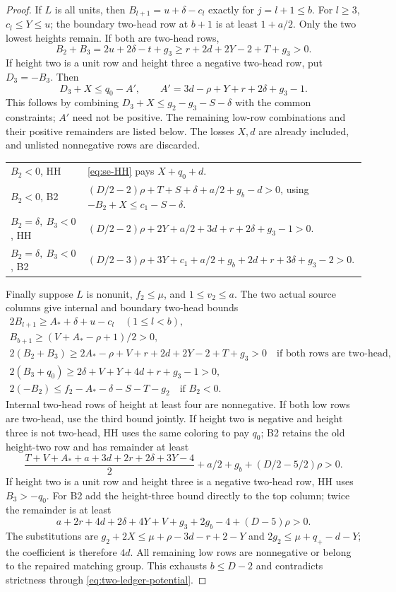 \documentclass[11pt,a4paper]{article}
\theoremstyle{definition}
\begin{document}
\begin{proof}
If $L$ is all units, then $B_{l+1}=u+\delta-c_l$ exactly for $j=l+1\le b$. For $l\ge3$, $c_l\le Y\le u$; the boundary two-head row at $b+1$ is at least $1+a/2$. Only the two lowest heights remain. If both are two-head rows,
\[
B_2+B_3=2u+2\delta-t+g_3
\ge r+2d+2Y-2+T+g_3>0.
\]
If height two is a unit row and height three a negative two-head row, put $D_3=-B_3$. Then
\[
D_3+X\le q_0-A',\qquad A'=3d-\rho+Y+r+2\delta+g_3-1.
\]
This follows by combining $D_3+X\le g_2-g_3-S-\delta$ with the common constraints; $A'$ need not be positive. The remaining low-row combinations and their positive remainders are listed below. The losses $X,d$ are already included, and unlisted nonnegative rows are discarded.
\begin{longtable}{P{.25\textwidth}P{.65\textwidth}}
\toprule
 & \\ \midrule\endhead
$B_2<0$, HH & \eqref{eq:se-HH} pays $X+q_0+d$.\\
$B_2<0$, B2 &
$(D/2-2)\rho+T+S+\delta+a/2+g_b-d>0$,
using $-B_2+X\le c_1-S-\delta$.\\
$B_2=\delta,\ B_3<0$, HH &
$(D/2-2)\rho+2Y+a/2+3d+r+2\delta+g_3-1>0$.\\
$B_2=\delta,\ B_3<0$, B2 &
$(D/2-3)\rho+3Y+c_1+a/2+g_b+2d+r+3\delta+g_3-2>0$.\\
\bottomrule\end{longtable}
Finally suppose $L$ is nonunit, $f_2\le\mu$, and $1\le v_2\le a$. The two actual source columns give internal and boundary two-head bounds
\begin{gather*}
2B_{l+1}\ge A_*+\delta+u-c_l\quad(1\le l<b),\\
B_{b+1}\ge(V+A_*-\rho+1)/2>0,\\
2(B_2+B_3)\ge2A_*-\rho+V+r+2d+2Y-2+T+g_3>0
\quad\text{if both rows are two-head},\\
2(B_3+q_0)\ge2\delta+V+Y+4d+r+g_3-1>0,\\
2(-B_2)\le f_2-A_*-\delta-S-T-g_2\quad\text{if }B_2<0.
\end{gather*}
Internal two-head rows of height at least four are nonnegative. If both low rows are two-head, use the third bound jointly. If height two is negative and height three is not two-head, HH uses the same coloring to pay $q_0$; B2 retains the old height-two row and has remainder at least
\[
\frac{T+V+A_*+a+3d+2r+2\delta+3Y-4}{2}
+a/2+g_b+(D/2-5/2)\rho>0.
\]
If height two is a unit row and height three is a negative two-head row, HH uses $B_3>-q_0$. For B2 add the height-three bound directly to the top column; twice the remainder is at least
\[
a+2r+4d+2\delta+4Y+V+g_3+2g_b-4+(D-5)\rho>0.
\]
The substitutions are $g_2+2X\le\mu+\rho-3d-r+2-Y$ and $2g_2\le\mu+q_+-d-Y$; the coefficient is therefore $4d$. All remaining low rows are nonnegative or belong to the repaired matching group. This exhausts $b\le D-2$ and contradicts strictness through \eqref{eq:two-ledger-potential}.

\end{proof}
\end{document}
